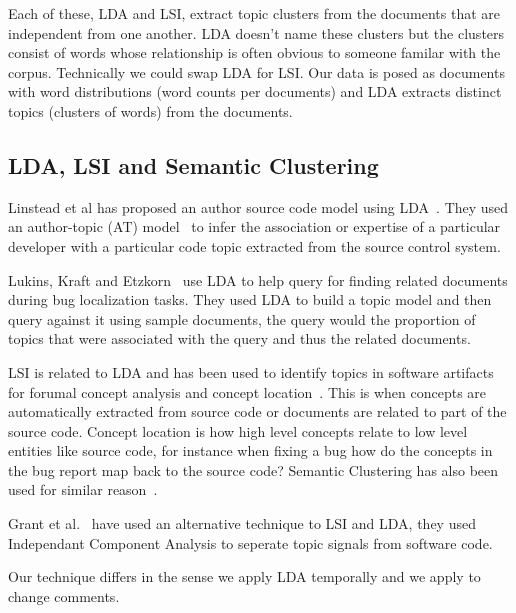 \documentclass[times, 10pt,twocolumn]{article}
\begin{document}
Each of these, LDA and LSI, extract topic clusters
from the documents that are independent from one another. LDA doesn't
name these clusters but the clusters consist of words whose
relationship is often obvious to someone familar with the
corpus. Technically we could swap LDA for LSI. Our data is posed as
documents with word distributions (word counts per documents) and LDA
extracts distinct topics (clusters of words) from the documents.

\subsection{LDA, LSI and Semantic Clustering}

Linstead et al has proposed an author source code model using
LDA~\cite{10.1109/MSR.2007.20,NIPS2007637,1321709}. They used an
author-topic (AT) model~\cite{1036902} to infer the association or
expertise of a particular developer with a particular code topic
extracted from the source control system.

Lukins, Kraft and Etzkorn~\cite{lukins2008} use LDA to help query for
finding related documents during bug localization tasks. They used LDA
to build a topic model and then query against it using sample
documents, the query would the proportion of topics that were
associated with the query and thus the related documents.

LSI is related to LDA and has been used to identify topics in software
artifacts for forumal concept analysis and concept
location~\cite{1421013,1374321,10.1109/ICPC.2007.13,10.1109/ICPC.2006.17}.
This is when concepts are automatically extracted from source code or
documents are related to part of the source code.  Concept location is
how high level concepts relate to low level entities like source code,
for instance when fixing a bug how do the concepts in the bug report
map back to the source code?  Semantic Clustering has also been used
for similar reason~\cite{1698774,1566153}.

Grant et al.~\cite{scottcordy} have used an alternative technique to
LSI and LDA, they used Independant Component Analysis to seperate
topic signals from software code.

Our technique differs in the sense we apply LDA temporally and we
apply to change comments.

\end{document}
